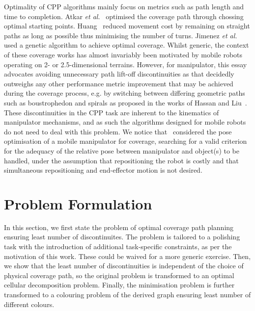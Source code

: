 \documentclass[journal]{IEEEtran}
\begin{document}
Optimality of CPP algorithms mainly focus on metrics such as path length and time to completion.
Atkar \textit{et al.}~\cite{Atkar2003Towards} optimised the coverage path through chossing optimal starting points. 
Huang~\cite{huang2001optimal} reduced movement cost by remaining on straight paths as long as possible thus minimising the number of turns. 
Jimenez \textit{et al.}~\cite{jimenez2007optimal} used a genetic algorithm to achieve optimal coverage. 
Whilst generic, the context of these coverage works has almost invariably been motivated by mobile robots operating on 2- or 2.5-dimensional terrains. However, for manipulator, this essay advocates avoiding unnecessary path lift-off discontinuities as that decidedly outweighs any other performance metric improvement that may be achieved during the coverage process, e.g. by switching between differing geometric paths such as boustrophedon and spirals as proposed in the works of Hassan and Liu~\cite{hassan2018a}. 
These discontinuities in the CPP task are inherent to the kinematics of manipulator mechanisms, and as such the algorithms designed for mobile robots do not need to deal with this problem. 
We notice that~\cite{paus2017a} considered the pose 
optimisation of a mobile manipulator for coverage, searching for a valid criterion for the adequacy of the relative pose between manipulator and object(s) to be handled, under the assumption that repositioning the robot is costly and that simultaneous repositioning and end-effector motion is not desired. 

\section{Problem Formulation}\label{sectionproblemformulation}
In this section, we first state the problem of optimal coverage path planning ensuring least number of discontinuites.
The problem is tailored to a polishing task with the introduction of additional task-specific constraints, as per the motivation of this work. 
These could be waived for a more generic exercise. 
Then, we show that the least number of discontinuities is independent of the choice of physical coverage path, 
so the original problem is transformed to an optimal cellular decomposition problem. 
Finally, the minimisation problem is further transformed to a colouring problem of the derived graph ensuring least number of different colours. 
\end{document}
